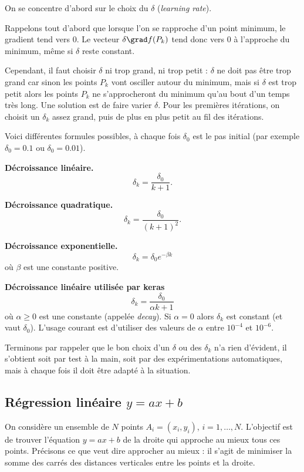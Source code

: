 On se concentre d'abord sur le choix du   $\delta$ (\emph{learning rate}).

Rappelons tout d'abord que lorsque l'on se rapproche d'un point minimum, le gradient tend vers $0$. Le vecteur $\delta \grad f(P_k)$ tend donc vers $0$ à l'approche du minimum, même si $\delta$ reste constant.

Cependant, il faut choisir $\delta$ ni trop grand, ni trop petit : $\delta$ ne doit pas être trop grand car sinon les points $P_k$ vont osciller autour du minimum, mais si $\delta$ est trop petit alors les points $P_k$ ne s'approcheront du minimum qu'au bout d'un temps très long. Une solution est de faire varier $\delta$. Pour les premières itérations, on choisit un $\delta_k$ assez grand, puis de plus en plus petit au fil des itérations.

Voici différentes formules possibles, à chaque fois $\delta_0$ est le pas initial (par exemple $\delta_0=0.1$ ou $\delta_0=0.01$).

\textbf{Décroissance linéaire.}
$$\delta_k = \frac{\delta_0}{k+1}.$$

\textbf{Décroissance quadratique.}
$$\delta_k = \frac{\delta_0}{(k+1)^2}.$$

\textbf{Décroissance exponentielle.}
$$\delta_k = \delta_0 e^{-\beta k}$$
où $\beta$ est une constante positive.


\textbf{Décroissance linéaire utilisée par keras}
$$\delta_k = \frac{\delta_0}{\alpha k+1}$$
où $\alpha\ge0$ est une constante (appelée \emph{decay}).
Si $\alpha=0$ alors $\delta_k$ est constant (et vaut $\delta_0$).
L'usage courant est d'utiliser des valeurs de $\alpha$ entre $10^{-4}$ et $10^{-6}$.


Terminons par rappeler que le bon choix d'un $\delta$ ou des $\delta_k$ n'a rien d'évident, il s'obtient soit par test à la main, soit par des expérimentations automatiques, mais à chaque fois il doit être adapté à la situation.



\subsection{Régression linéaire $y=ax+b$}


On considère un ensemble de $N$ points $A_i = (x_i,y_i)$, $i=1,\ldots,N$.
L'objectif est de trouver l'équation $y=ax+b$ de la droite qui approche au mieux tous ces points. Précisons ce que veut dire \og{}approcher au mieux\fg{} : il s'agit de minimiser la somme des carrés des distances verticales entre les points et la droite.


